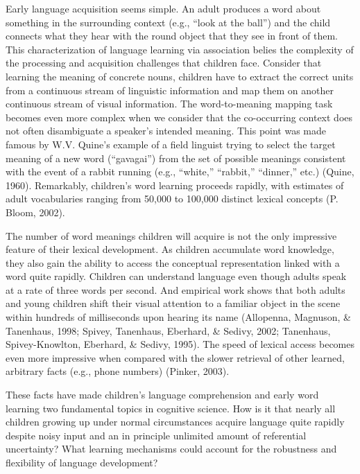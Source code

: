 \documentclass[oneside]{report}
\begin{document}
Early language acquisition seems simple. An adult produces a word about
something in the surrounding context (e.g., ``look at the ball'') and
the child connects what they hear with the round object that they see in
front of them. This characterization of language learning via
association belies the complexity of the processing and acquisition
challenges that children face. Consider that learning the meaning of
concrete nouns, children have to extract the correct units from a
continuous stream of linguistic information and map them on another
continuous stream of visual information. The word-to-meaning mapping
task becomes even more complex when we consider that the co-occurring
context does not often disambiguate a speaker's intended meaning. This
point was made famous by W.V. Quine's example of a field linguist trying
to select the target meaning of a new word (``gavagai'') from the set of
possible meanings consistent with the event of a rabbit running (e.g.,
``white,'' ``rabbit,'' ``dinner,'' etc.) (Quine, 1960). Remarkably,
children's word learning proceeds rapidly, with estimates of adult
vocabularies ranging from 50,000 to 100,000 distinct lexical concepts
(P. Bloom, 2002).

The number of word meanings children will acquire is not the only
impressive feature of their lexical development. As children accumulate
word knowledge, they also gain the ability to access the conceptual
representation linked with a word quite rapidly. Children can understand
language even though adults speak at a rate of three words per second.
And empirical work shows that both adults and young children shift their
visual attention to a familiar object in the scene within hundreds of
milliseconds upon hearing its name (Allopenna, Magnuson, \& Tanenhaus,
1998; Spivey, Tanenhaus, Eberhard, \& Sedivy, 2002; Tanenhaus,
Spivey-Knowlton, Eberhard, \& Sedivy, 1995). The speed of lexical access
becomes even more impressive when compared with the slower retrieval of
other learned, arbitrary facts (e.g., phone numbers) (Pinker, 2003).

These facts have made children's language comprehension and early word
learning two fundamental topics in cognitive science. How is it that
nearly all children growing up under normal circumstances acquire
language quite rapidly despite noisy input and an in principle unlimited
amount of referential uncertainty? What learning mechanisms could
account for the robustness and flexibility of language development?
\end{document}

